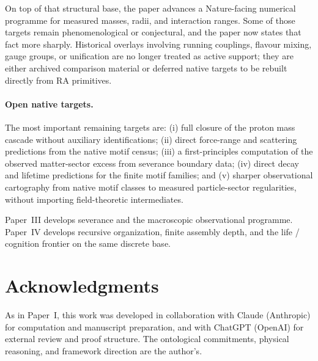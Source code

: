 \documentclass[11pt]{article}
\begin{document}
On top of that structural base, the paper advances a Nature-facing numerical programme for measured masses, radii, and interaction ranges. Some of those targets remain phenomenological or conjectural, and the paper now states that fact more sharply. Historical overlays involving running couplings, flavour mixing, gauge groups, or unification are no longer treated as active support; they are either archived comparison material or deferred native targets to be rebuilt directly from RA primitives.

\paragraph{Open native targets.} The most important remaining targets are: (i) full closure of the proton mass cascade without auxiliary identifications; (ii) direct force-range and scattering predictions from the native motif census; (iii) a first-principles computation of the observed matter-sector excess from severance boundary data; (iv) direct decay and lifetime predictions for the finite motif families; and (v) sharper observational cartography from native motif classes to measured particle-sector regularities, without importing field-theoretic intermediates.

Paper~III develops severance and the macroscopic observational programme. Paper~IV develops recursive organization, finite assembly depth, and the life / cognition frontier on the same discrete base.

\section*{Acknowledgments}

As in Paper~I, this work was developed in collaboration with Claude (Anthropic) for computation and manuscript preparation, and with ChatGPT (OpenAI) for external review and proof structure. The ontological commitments, physical reasoning, and framework direction are the author's.
\end{document}
